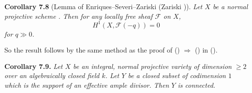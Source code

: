 {\medskip
\noindent\hypertarget{result-III-7.8}{}\textbf{Corollary 7.8} (Lemma of Enriques--Severi--Zariski (Zariski )). \emph{Let $X$ be a normal projective scheme . Then for any locally free sheaf $\mathcal F$ \EditionText{}on $X$,}
\[
H^1(X,\mathcal F(-q))=0
\]
\noindent\emph{for $q\gg0$.}

\Proof {} So the result follows by the same method as the proof of () $\Rightarrow$ () in ().

\medskip
\noindent\hypertarget{result-III-7.9}{}\textbf{Corollary 7.9.} \emph{Let $X$ be an integral, normal projective variety of dimension $\ge2$ over an algebraically closed field $k$. Let $Y$ be a closed subset of codimension $1$ which is the support of an effective ample divisor. Then $Y$ is connected.}
}
